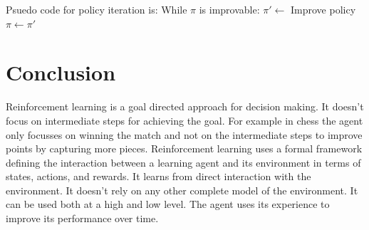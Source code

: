 \documentclass[12pt]{article}
\begin{document}
Psuedo code for policy iteration is:
While $\pi$ is improvable:
 $\pi '\leftarrow$ Improve policy
 $\pi \leftarrow \pi '$

\section{Conclusion}
Reinforcement learning is a goal directed approach for decision making. It doesn't focus on intermediate steps for achieving the goal. For example in chess the agent only focusses on winning the match and not on the intermediate steps to improve points by capturing more pieces. 
Reinforcement learning uses a formal framework defining the interaction
between a learning agent and its environment in terms of states, actions, and
rewards.
It learns from direct interaction with the environment. It doesn't rely on any other complete model of the environment. It can be used both at a high and low level.
The agent uses its experience to improve its performance over time.
\end{document}
